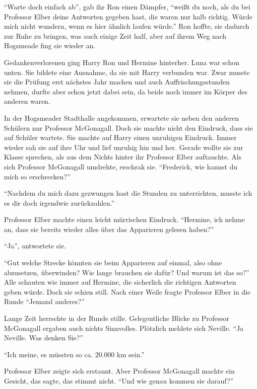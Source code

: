 \enquote{Warte doch einfach ab}, gab ihr Ron einen Dämpfer, \enquote{weißt du noch, als du bei Professor Elber deine Antworten gegeben hast, die waren nur halb richtig. Würde mich nicht wundern, wenn es hier ähnlich laufen würde.} Ron hoffte, sie dadurch zur Ruhe zu bringen, was auch einige Zeit half, aber auf ihrem Weg nach Hogsmeade fing sie wieder an.

Gedankenverlorenen ging Harry Ron und Hermine hinterher. Luna war schon unten. Sie bildete eine Ausnahme, da sie mit Harry verbunden war. Zwar musste sie die Prüfung erst nächstes Jahr machen und auch Auffrischungsstunden nehmen, durfte aber schon jetzt dabei sein, da beide noch immer im Körper des anderen waren.

In der Hogsmeader Stadthalle angekommen, erwartete sie neben den anderen Schülern nur Professor McGonagall. Doch sie machte nicht den Eindruck, dass sie auf Schüler wartete. Sie machte auf Harry einen unruhigen Eindruck. Immer wieder sah sie auf ihre Uhr und lief unruhig hin und her. Gerade wollte sie zur Klasse sprechen, als aus dem Nichts hinter ihr Professor Elber auftauchte. Als sich Professor McGonagall umdrehte, erschrak sie. \enquote{Frederick, wie kannst du mich so erschrecken?}

\enquote{Nachdem du mich dazu gezwungen hast die Stunden zu unterrichten, musste ich es dir doch irgendwie zurückzahlen.}

Professor Elber machte einen leicht mürrischen Eindruck. \enquote{Hermine, ich nehme an, dass sie bereits wieder alles über das Apparieren gelesen haben?}

\enquote{Ja}, antwortete sie.

\enquote{Gut \gst welche Strecke könnten sie beim Apparieren auf einmal, also ohne abzusetzen, überwinden? Wie lange brauchen sie dafür? Und warum ist das so?} Alle schauten wie immer auf Hermine, die sicherlich die richtigen Antworten geben würde. Doch sie schien still. Nach einer Weile fragte Professor Elber in die Runde \enquote{Jemand anderes?}

Lange Zeit herrschte in der Runde stille. Gelegentliche Blicke zu Professor McGonagall ergaben auch nichts Sinnvolles. Plötzlich meldete sich Neville. \enquote{Ja Neville. Was denken Sie?}

\enquote{Ich meine, es müssten so ca. 20.000 km sein.}

Professor Elber zeigte sich erstaunt. Aber Professor McGonagall machte ein Gesicht, das sagte, das stimmt nicht. \enquote{Und wie genau kommen sie darauf?}

